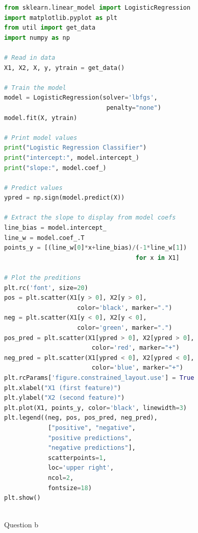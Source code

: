 \documentclass[10pt]{article}
\begin{document}
\begin{lstlisting}[language=Python]
from sklearn.linear_model import LogisticRegression
import matplotlib.pyplot as plt
from util import get_data
import numpy as np

# Read in data
X1, X2, X, y, ytrain = get_data()

# Train the model
model = LogisticRegression(solver='lbfgs', 
                            penalty="none")
model.fit(X, ytrain)

# Print model values
print("Logistic Regression Classifier")
print("intercept:", model.intercept_)
print("slope:", model.coef_)

# Predict values
ypred = np.sign(model.predict(X))

# Extract the slope to display from model coefs
line_bias = model.intercept_
line_w = model.coef_.T
points_y = [(line_w[0]*x+line_bias)/(-1*line_w[1])
                                    for x in X1]

# Plot the preditions
plt.rc('font', size=20)
pos = plt.scatter(X1[y > 0], X2[y > 0],
                    color='black', marker=".")
neg = plt.scatter(X1[y < 0], X2[y < 0],
                    color='green', marker=".")
pos_pred = plt.scatter(X1[ypred > 0], X2[ypred > 0],
                        color='red', marker="+")
neg_pred = plt.scatter(X1[ypred < 0], X2[ypred < 0],
                        color='blue', marker="+")
plt.rcParams['figure.constrained_layout.use'] = True
plt.xlabel("X1 (first feature)")
plt.ylabel("X2 (second feature)")
plt.plot(X1, points_y, color='black', linewidth=3)
plt.legend((neg, pos, pos_pred, neg_pred), 
            ["positive", "negative",
            "positive predictions",
            "negative predictions"],
            scatterpoints=1,
            loc='upper right',
            ncol=2,
            fontsize=18)
plt.show()
    
\end{lstlisting}
Question b
\end{document}
